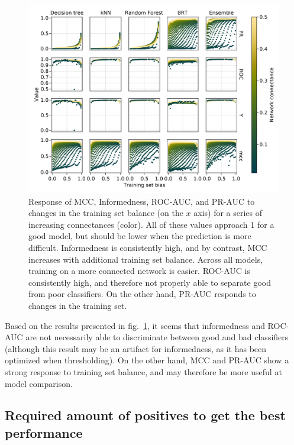 \documentclass[10pt,oneside]{article}
\makeatletter
\def\maxwidth{\ifdim\Gin@nat@width>\linewidth\linewidth
\else\Gin@nat@width\fi}
\let\Oldincludegraphics\includegraphics
\renewcommand{\includegraphics}[1]{\Oldincludegraphics[width=\maxwidth]{#1}}
\makeatother
\begin{document}
\begin{figure}
\hypertarget{fig:biasco}{%
\centering
\includegraphics{figures/bias_by_connectance.png}
\caption{Response of MCC, Informedness, ROC-AUC, and PR-AUC to changes
in the training set balance (on the \(x\) axis) for a series of
increasing connectances (color). All of these values approach 1 for a
good model, but should be lower when the prediction is more difficult.
Informedness is consistently high, and by contrast, MCC increases with
additional training set balance. Across all models, training on a more
connected network is easier. ROC-AUC is consistently high, and therefore
not properly able to separate good from poor classifiers. On the other
hand, PR-AUC responds to changes in the training set.}\label{fig:biasco}
}
\end{figure}

Based on the results presented in fig.~\ref{fig:biasco}, it seems that
informedness and ROC-AUC are not necessarily able to discriminate
between good and bad classifiers (although this result may be an
artifact for informedness, as it has been optimized when thresholding).
On the other hand, MCC and PR-AUC show a strong response to training set
balance, and may therefore be more useful at model comparison.

\hypertarget{required-amount-of-positives-to-get-the-best-performance}{%
\subsection{Required amount of positives to get the best
performance}\label{required-amount-of-positives-to-get-the-best-performance}}
\end{document}
